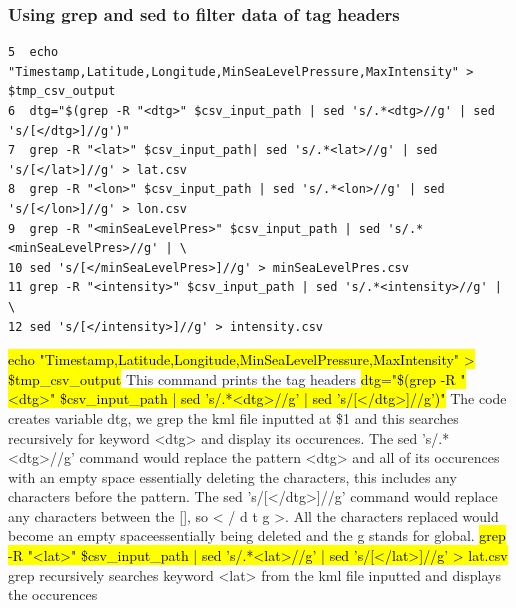 \documentclass[]{article}
\begin{document}
\subsubsection{Using grep and sed to filter data of tag headers}
\begin{tcolorbox}[colback=white, colframe=black, boxrule=1pt, arc=2mm, 
    title=Using grep and sed to filter data of tag headers, width=6.7in, fonttitle=\bfseries, listing only, listing options={language=sh, basicstyle=\ttfamily}]
\begin{verbatim}
5  echo "Timestamp,Latitude,Longitude,MinSeaLevelPressure,MaxIntensity" > $tmp_csv_output
6  dtg="$(grep -R "<dtg>" $csv_input_path | sed 's/.*<dtg>//g' | sed 's/[</dtg>]//g')"
7  grep -R "<lat>" $csv_input_path| sed 's/.*<lat>//g' | sed 's/[</lat>]//g' > lat.csv
8  grep -R "<lon>" $csv_input_path | sed 's/.*<lon>//g' | sed 's/[</lon>]//g' > lon.csv
9  grep -R "<minSeaLevelPres>" $csv_input_path | sed 's/.*<minSeaLevelPres>//g' | \
10 sed 's/[</minSeaLevelPres>]//g' > minSeaLevelPres.csv
11 grep -R "<intensity>" $csv_input_path | sed 's/.*<intensity>//g' | \ 
12 sed 's/[</intensity>]//g' > intensity.csv
\end{verbatim}
\hl{echo "Timestamp,Latitude,Longitude,MinSeaLevelPressure,MaxIntensity" > \$tmp\_csv\_output}\newline
This command prints the tag headers\newline
\hl{dtg="\$(grep -R "<dtg>" \$csv\_input\_path | sed 's/.*<dtg>//g' | sed 's/[</dtg>]//g')"}\newline
The code creates variable dtg, we grep the kml file inputted at \$1 and this searches recursively\newline
for keyword <dtg> and display its occurences. The sed 's/.*<dtg>//g' command would replace the\newline
pattern <dtg> and all of its occurences with an empty space essentially deleting the characters,\newline
this includes any characters before the pattern. The sed 's/[</dtg>]//g' command would replace\newline
any characters between the [], so < / d t g >. All the characters replaced would become an\newline
empty spaceessentially being deleted and the g stands for global.\newline
\hl{grep -R "<lat>" \$csv\_input\_path | sed 's/.*<lat>//g' | sed 's/[</lat>]//g' > lat.csv}\newline
grep recursively searches keyword <lat> from the kml file inputted and displays the occurences\newline

\end{tcolorbox}
\end{document}

